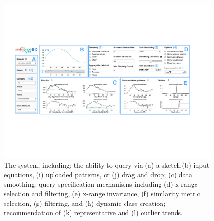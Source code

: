 \begin{figure}[ht!]
  \centering
  \vspace{-5pt}
  \includegraphics[width=0.95\linewidth]{figures/zvpp_system.pdf} %
  \vspace{-5pt}\caption{The \zvpp system, including: the ability to query via (a) a sketch,(b) input equations, (i) uploaded patterns, or (j) drag and drop; (c) data smoothing; query specification mechanisms including (d) x-range selection and filtering, (e) x-range invariance, (f) similarity metric selection, (g) filtering, and (h) dynamic class creation; recommendation of (k) representative and (l) outlier trends.} %
  \label{zvOverview}
  \vspace{-5pt}
\end{figure}

